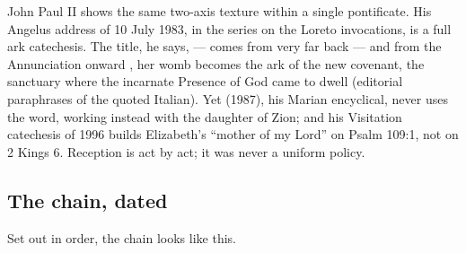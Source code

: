 John Paul II shows the same two-axis texture within a single pontificate.
His Angelus address of 10 July 1983, in the series on the Loreto
invocations, is a full ark catechesis. The title, he says,  --- comes from very far back --- and from the Annunciation
onward , her womb
becomes the ark of the new covenant, the sanctuary where the incarnate
Presence of God came to dwell (editorial paraphrases of the quoted Italian).
Yet  (1987), his Marian encyclical, never uses the
word, working instead with the daughter of Zion; and his Visitation
catechesis of 1996 builds Elizabeth's ``mother of my Lord'' on Psalm 109:1,
not on 2 Kings 6. Reception is act by act; it was never a uniform
policy.

\subsection{The chain, dated}

Set out in order, the chain looks like this.

